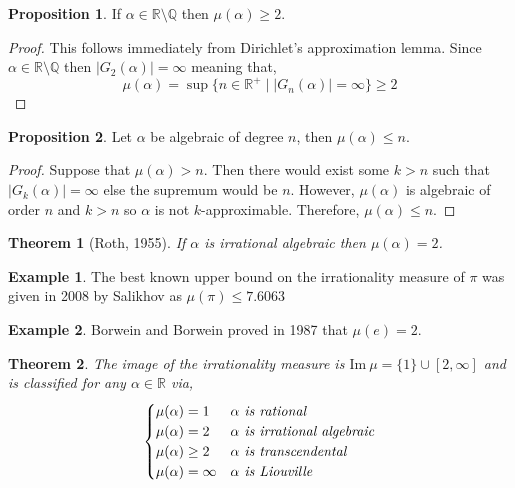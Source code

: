 \documentclass{article}
\newcommand{\Q}{\mathbb{Q}}
\newcommand{\R}{\mathbb{R}}
\newcommand{\Rplus}{\mathbb{R}^+}
\renewcommand{\Im}[1]{\mathrm{Im} \: #1}
\theoremstyle{theorem}
\newtheorem{theorem}{Theorem}[section]
\theoremstyle{definition}
\theoremstyle{definition}
\newtheorem*{proposition}{Proposition}
\theoremstyle{remark}
\theoremstyle{definition}
\newtheorem{example}{Example}[section]
\theoremstyle{remark}
\begin{document}
\begin{proposition}
If $\alpha \in \R \setminus \Q$ then $\mu(\alpha) \ge 2$. 
\end{proposition}

\begin{proof}
This follows immediately from Dirichlet's approximation lemma. Since $\alpha \in \R \setminus \Q$ then $|G_2(\alpha)| = \infty$ meaning that,
\[ \mu(\alpha) = \sup\{n \in \Rplus \mid |G_n(\alpha)| = \infty\} \ge 2 \]
\end{proof}


\begin{proposition}
Let $\alpha$ be algebraic of degree $n$, then $\mu(\alpha) \le n$. 
\end{proposition}

\begin{proof}
Suppose that $\mu(\alpha) > n$. Then there would exist some $k > n$ such that $|G_k(\alpha)| = \infty$ else the supremum would be $n$. However, $\mu(\alpha)$ is algebraic of order $n$ and $k > n$ so $\alpha$ is not $k$-approximable. Therefore, $\mu(\alpha) \le n$. 
\end{proof}

\begin{theorem}[Roth, 1955]
If $\alpha$ is irrational algebraic then $\mu(\alpha) = 2$.
\end{theorem}

\begin{example}
The best known upper bound on the irrationality measure of $\pi$ was given in 2008 by Salikhov as $\mu(\pi) \le 7.6063$ 
\end{example}

\begin{example}
Borwein and Borwein proved in 1987 that $\mu(e) = 2$. 
\end{example}

\begin{theorem}
The image of the irrationality measure is $\Im{\mu} = \{ 1 \} \cup [2, \infty]$ and is classified for any $\alpha \in \R$ via,
\[
\begin{cases}
\mu(\alpha) = 1 & \alpha \emph{ is rational}
\\
\mu(\alpha) = 2 & \alpha \emph{ is irrational algebraic}
\\
\mu(\alpha) \ge 2 & \alpha \emph{ is transcendental}
\\
\mu(\alpha) = \infty & \alpha \emph{ is Liouville}
\end{cases}
 \]
\end{theorem}
\end{document}
